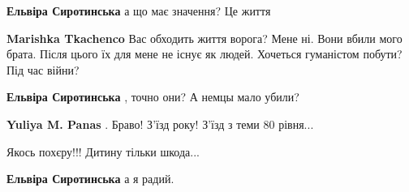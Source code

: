 \begin{itemize}
\begin{itemize}
\textbf{Ельвіра Сиротинська} а що має значення? Це життя

\begin{itemize}
 
\textbf{Marishka Tkachenco} Вас обходить життя ворога? Мене ні. Вони вбили мого брата. Після цього їх для мене не існує як людей. Хочеться гуманістом побути? Під час війни?

 
\textbf{Ельвіра Сиротинська} , точно они? А немцы мало убили?

 
\textbf{Yuliya M. Panas} . Браво! З'їзд року! З'їзд з теми 80 рівня... 🤣
\end{itemize}

 
Якось похєру!!! Дитину тільки шкода...

 
\textbf{Ельвіра Сиротинська} а я радий.

 

\end{itemize}
\end{itemize}
